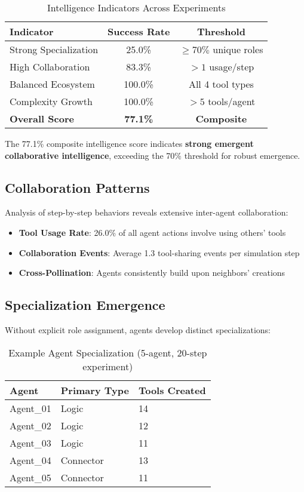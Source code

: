 \documentclass[10pt,twocolumn]{article}
\begin{document}
\begin{table}[H]
\centering
\caption{Intelligence Indicators Across Experiments}
\begin{tabular}{@{}lcc@{}}
\toprule
\textbf{Indicator} & \textbf{Success Rate} & \textbf{Threshold} \\
\midrule
Strong Specialization & 25.0\% & $\geq 70\%$ unique roles \\
High Collaboration & 83.3\% & $> 1$ usage/step \\
Balanced Ecosystem & 100.0\% & All 4 tool types \\
Complexity Growth & 100.0\% & $> 5$ tools/agent \\
\midrule
\textbf{Overall Score} & \textbf{77.1\%} & \textbf{Composite} \\
\bottomrule
\end{tabular}
\end{table}

The 77.1\% composite intelligence score indicates \textbf{strong emergent collaborative intelligence}, exceeding the 70\% threshold for robust emergence.

\subsection{Collaboration Patterns}

Analysis of step-by-step behaviors reveals extensive inter-agent collaboration:

\begin{itemize}
\item \textbf{Tool Usage Rate}: 26.0\% of all agent actions involve using others' tools
\item \textbf{Collaboration Events}: Average 1.3 tool-sharing events per simulation step
\item \textbf{Cross-Pollination}: Agents consistently build upon neighbors' creations
\end{itemize}

\subsection{Specialization Emergence}

Without explicit role assignment, agents develop distinct specializations:

\begin{table}[H]
\centering
\caption{Example Agent Specialization (5-agent, 20-step experiment)}
\begin{tabular}{@{}lll@{}}
\toprule
\textbf{Agent} & \textbf{Primary Type} & \textbf{Tools Created} \\
\midrule
Agent\_01 & Logic & 14 \\
Agent\_02 & Logic & 12 \\
Agent\_03 & Logic & 11 \\
Agent\_04 & Connector & 13 \\
Agent\_05 & Connector & 11 \\
\bottomrule
\end{tabular}
\end{table}
\end{document}
